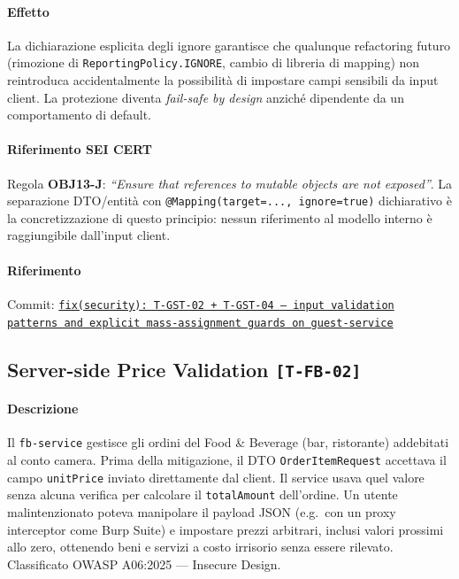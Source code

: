 ﻿\documentclass[a4paper,12pt]{report}
\newcommand{\commitref}[2]{\texttt{\small \href{https://github.com/diegoandruccioli/hotel-pms/commit/#1}{#2}}}
\newcommand{\threat}[1]{\texttt{\small\textcolor{vulnred}{[#1]}}}
\begin{document}
\paragraph{Effetto}
La dichiarazione esplicita degli ignore garantisce che qualunque refactoring
futuro (rimozione di \texttt{ReportingPolicy.IGNORE}, cambio di libreria di
mapping) non reintroduca accidentalmente la possibilità di impostare campi
sensibili da input client. La protezione diventa \emph{fail-safe by design}
anziché dipendente da un comportamento di default.

\paragraph{Riferimento SEI CERT} Regola \textbf{OBJ13-J}: \emph{``Ensure that references to mutable objects are not exposed''}. La separazione DTO/entità con \texttt{@Mapping(target=..., ignore=true)} dichiarativo è la concretizzazione di questo principio: nessun riferimento al modello interno è raggiungibile dall'input client.

\paragraph{Riferimento} Commit: \commitref{fb6fdff}{fix(security): T-GST-02 + T-GST-04 --- input validation \\
patterns and explicit mass-assignment guards on guest-service}

\subsection{Server-side Price Validation \threat{T-FB-02}}

\paragraph{Descrizione}
Il \texttt{fb-service} gestisce gli ordini del Food \& Beverage (bar, ristorante)
addebitati al conto camera. Prima della mitigazione, il DTO \texttt{OrderItemRequest}
accettava il campo \texttt{unitPrice} inviato direttamente dal client. Il service
usava quel valore senza alcuna verifica per calcolare il \texttt{totalAmount}
dell'ordine. Un utente malintenzionato poteva manipolare il payload JSON
(e.g.\ con un proxy interceptor come Burp Suite) e impostare prezzi arbitrari,
inclusi valori prossimi allo zero, ottenendo beni e servizi a costo irrisorio
senza essere rilevato. Classificato OWASP A06:2025 --- Insecure Design.
\end{document}

